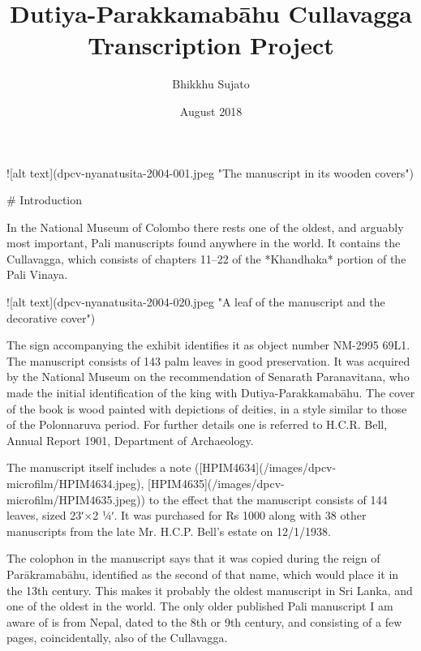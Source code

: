 \documentclass[11pt, openany,a5paper]{article}
\title{Dutiya-Parakkamabāhu Cullavagga Transcription Project}
\author{Bhikkhu Sujato}
\date{August 2018}
\begin{document}
\maketitle

\thispagestyle{empty}

\begin{markdown}

![alt text](dpcv-nyanatusita-2004-001.jpeg "The manuscript in its wooden covers")

\end{markdown}

\newpage

\tableofcontents


\begin{markdown}



# Introduction

In the National Museum of Colombo there rests one of the oldest, and arguably most important, Pali manuscripts found anywhere in the world. It contains the Cullavagga, which consists of chapters 11–22 of the *Khandhaka* portion of the Pali Vinaya.

![alt text](dpcv-nyanatusita-2004-020.jpeg "A leaf of the manuscript and the decorative cover")

The sign accompanying the exhibit identifies it as object number NM-2995 69L1. The manuscript consists of 143 palm leaves in good preservation. It was acquired by the National Museum on the recommendation of Senarath Paranavitana, who made the initial identification of the king with Dutiya-Parakkamabāhu. The cover of the book is wood painted with depictions of deities, in a style similar to those of the Polonnaruva period. For further details one is referred to H.C.R. Bell, Annual Report 1901, Department of Archaeology.

The manuscript itself includes a note ([HPIM4634](/images/dpcv-microfilm/HPIM4634.jpeg), [HPIM4635](/images/dpcv-microfilm/HPIM4635.jpeg)) to the effect that the manuscript consists of 144 leaves, sized 23ʹ×2 ¼ʹ. It was purchased for Rs 1000 along with 38 other manuscripts from the late Mr. H.C.P. Bell’s estate on 12/1/1938.

The colophon in the manuscript says that it was copied during the reign of Parākramabāhu, identified as the second of that name, which would place it in the 13th century. This makes it probably the oldest manuscript in Sri Lanka, and one of the oldest in the world. The only older published Pali manuscript I am aware of is from Nepal, dated to the 8th or 9th century, and consisting of a few pages, coincidentally, also of the Cullavagga.


\end{markdown}
\end{document}
